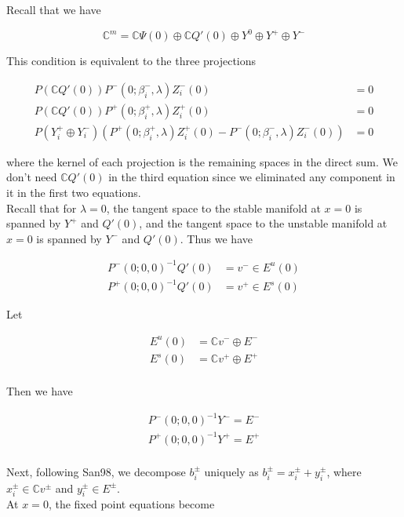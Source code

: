 \documentclass[12pt]{article}
\def\C{{\mathbb C}}
\begin{document}
Recall that we have

\[
\C^m = \C \Psi(0) \oplus \C Q'(0) \oplus Y^0 \oplus Y^+ \oplus Y^- 
\]

This condition is equivalent to the three projections

\begin{align*}
P(\C Q'(0) ) P^-(0; \beta_i^-, \lambda) Z_i^-(0) &= 0 \\
P(\C Q'(0) ) P^+(0; \beta_i^+, \lambda) Z_i^+(0) &= 0 \\
P(Y_i^+ \oplus Y_i^-) ( P^+(0; \beta_i^+, \lambda) Z_i^+(0) - P^-(0; \beta_i^-, \lambda) Z_i^-(0) ) &= 0
\end{align*}

where the kernel of each projection is the remaining spaces in the direct sum. We don't need $\C Q'(0)$ in the third equation since we eliminated any component in it in the first two equations.\\

Recall that for $\lambda = 0$, the tangent space to the stable manifold at $x = 0$ is spanned by $Y^+$ and $Q'(0)$, and the tangent space to the unstable manifold at $x = 0$ is spanned by $Y^-$ and $Q'(0)$. Thus we have

\begin{align*}
P^-(0; 0, 0)^{-1} Q'(0) &= v^- \in E^u(0) \\
P^+(0; 0, 0)^{-1} Q'(0) &= v^+ \in E^s(0)
\end{align*}

Let

\begin{align*}
E^u(0) &= \C v^- \oplus E^- \\
E^s(0) &= \C v^+ \oplus E^+ \\
\end{align*}

Then we have

\begin{align*}
P^-(0; 0, 0)^{-1} Y^- = E^- \\
P^+(0; 0, 0)^{-1} Y^+ = E^+ \\
\end{align*}

Next, following San98, we decompose $b_i^\pm$ uniquely as $b_i^\pm = x_i^\pm + y_i^\pm$, where $x_i^\pm \in \C v^\pm$ and $y_i^\pm \in E^\pm$.\\

At $x = 0$, the fixed point equations become
\end{document}
